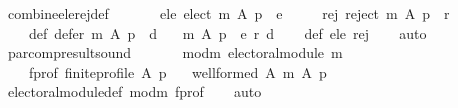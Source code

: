 \begin{isabellebody}
\isadelimdocument
%
\endisadelimdocument
%
\isatagdocument
%
\isamarkuptrue%
%
\endisatagdocument
{\isafolddocument}%
%
\isadelimdocument
%
\endisadelimdocument
{}\isamarkupfalse%
\ combine{\isacharunderscore}{\kern0pt}ele{\isacharunderscore}{\kern0pt}rej{\isacharunderscore}{\kern0pt}def{\isacharcolon}{\kern0pt}\isanewline
\ \ \isanewline
\ \ \ \ ele{\isacharcolon}{\kern0pt}\ {\isachardoublequoteopen}elect\ m\ A\ p\ {\isacharequal}{\kern0pt}\ e{\isachardoublequoteclose}\ \isanewline
\ \ \ \ rej{\isacharcolon}{\kern0pt}\ {\isachardoublequoteopen}reject\ m\ A\ p\ {\isacharequal}{\kern0pt}\ r{\isachardoublequoteclose}\ \isanewline
\ \ \ \ def{\isacharcolon}{\kern0pt}\ {\isachardoublequoteopen}defer\ m\ A\ p\ {\isacharequal}{\kern0pt}\ d{\isachardoublequoteclose}\isanewline
\ \ \ {\isachardoublequoteopen}m\ A\ p\ {\isacharequal}{\kern0pt}\ {\isacharparenleft}{\kern0pt}e{\isacharcomma}{\kern0pt}\ r{\isacharcomma}{\kern0pt}\ d{\isacharparenright}{\kern0pt}{\isachardoublequoteclose}\isanewline
%
\isadelimproof
\ \ %
\endisadelimproof
%
\isatagproof
{}\isamarkupfalse%
\ def\ ele\ rej\isanewline
\ \ \isamarkupfalse%
\ auto%
\endisatagproof
{\isafoldproof}%
%
\isadelimproof
\isanewline
%
\endisadelimproof
\isanewline
{}\isamarkupfalse%
\ par{\isacharunderscore}{\kern0pt}comp{\isacharunderscore}{\kern0pt}result{\isacharunderscore}{\kern0pt}sound{\isacharcolon}{\kern0pt}\isanewline
\ \ \isanewline
\ \ \ \ mod{\isacharunderscore}{\kern0pt}m{\isacharcolon}{\kern0pt}\ {\isachardoublequoteopen}electoral{\isacharunderscore}{\kern0pt}module\ m{\isachardoublequoteclose}\ \isanewline
\ \ \ \ f{\isacharunderscore}{\kern0pt}prof{\isacharcolon}{\kern0pt}\ {\isachardoublequoteopen}finite{\isacharunderscore}{\kern0pt}profile\ A\ p{\isachardoublequoteclose}\isanewline
\ \ \ {\isachardoublequoteopen}well{\isacharunderscore}{\kern0pt}formed\ A\ {\isacharparenleft}{\kern0pt}m\ A\ p{\isacharparenright}{\kern0pt}{\isachardoublequoteclose}\isanewline
%
\isadelimproof
\ \ %
\endisadelimproof
%
\isatagproof
{}\isamarkupfalse%
\ electoral{\isacharunderscore}{\kern0pt}module{\isacharunderscore}{\kern0pt}def\ mod{\isacharunderscore}{\kern0pt}m\ f{\isacharunderscore}{\kern0pt}prof\isanewline
\ \ \isamarkupfalse%
\ auto%
\endisatagproof
{\isafoldproof}%
%
\isadelimproof
\isanewline
%
\endisadelimproof
\isanewline
{}\isamarkupfalse%

\end{isabellebody}
